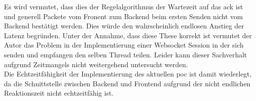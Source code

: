 Es wird vermutet, dass dies der Regelalgorithmus der Wartezeit auf das \ac{ack} ist und generell Packete vom Fronent zum Backend beim ersten Senden nicht vom Backend bestätigt werden.
Dies würde den wahrscheinlich endlosen Anstieg der Latenz begründen.
Unter der Annahme, dass diese These korrekt ist vermutet der Autor das Problem in der Implementierung einer Websocket Session in der sich senden und empfangen den selben Thread teilen.
Leider kann dieser Sachverhalt aufgrund Zeitmangels nicht weitergehend untersucht werden.
\\Die Echtzeitfähigkeit der Implementierung des aktuellen \ac{poc} ist damit wiederlegt, da die Schnittstelle zwischen Backend und Frontend aufgrund der nicht endlichen Reaktionszeit nicht echtzeitfähig ist.
